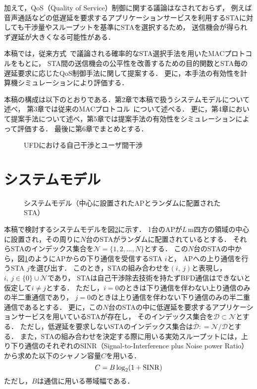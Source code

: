 \documentclass[technicalreport]{ieicej}
\newcommand{\sij}{(i,\ j)}
\newcommand{\mN}{{\mathcal N}}
\def\coloneqq{\mathrel{\mathop:}=}
\begin{document}
	加えて，QoS（Quality of Service）制御に関する議論はなされておらず，
	例えば音声通話などの低遅延を要求するアプリケーションサービスを利用するSTAに対しても干渉量やスループットを基準にSTAを選択するため，
	送信機会が得られず遅延が大きくなる可能性がある．
	\par
	本稿では，従来方式~\cite{promac}で議論される確率的なSTA選択手法を用いたMACプロトコルをもとに，
	STA間の送信機会の公平性を改善するための目的関数とSTA毎の遅延要求に応じたQoS制御手法に関して提案する．
	更に，本手法の有効性を計算機シミュレーションにより評価する．
	\par
	本稿の構成は以下のとおりである．第2章で本稿で扱うシステムモデルについて述べ，
	第3章では従来のMACプロトコル~\cite{promac}について述べる．
	更に，第4章において提案手法について述べ，第5章では提案手法の有効性をシミュレーションによって評価する．
	最後に第6章でまとめとする．

	\begin{figure}[t]
		\centering
		\caption{UFDにおける自己干渉とユーザ間干渉}
		\label{fig:topology}
	\end{figure}

\section{システムモデル}
	\begin{figure}[t]
		\centering
		\caption{システムモデル（中心に設置されたAPとランダムに配置されたSTA）}
		\label{fig:model}
	\end{figure}

	本稿で検討するシステムモデルを図\ref{fig:model}に示す．
	1台のAPが$L$\,m四方の領域の中心に設置され，その周りに$N$台のSTAがランダムに配置されているとする．
	それらSTAのインデックス集合を$\mN=\{1,2,...,N\}$とする．
	この$N$台のSTAの中から，図\ref{fig:topology}のようにAPからの下り通信を受信するSTA $i$と，
	APへの上り通信を行うSTA $j$を選び出す．
	このとき，STAの組み合わせを$\sij$と表現し，$i,\ j \in \{0\}\cup \mN$であり，
	STAは自己干渉除去技術を持たずBFD通信はできないと仮定して$i\neq j$とする．
	ただし，$i=0$のときは下り通信を伴わない上り通信のみの半二重通信であり，
	$j=0$のときは上り通信を伴わない下り通信のみの半二重通信であるとする．
	更に，この$N$台のSTAの中に低遅延を要求するアプリケーションサービスを用いているSTAが存在し，
	そのインデックス集合を${\mathcal D}\subset\mN$とする．
	ただし，低遅延を要求しないSTAのインデックス集合は${\overline {\mathcal D}}\coloneqq{\mathcal N}/{\mathcal D}$とする．
	また，STAの組み合わせを決定する際に用いる実効スループットには，上り下り通信のそれぞれのSINR（Signal-to-Interference plus Noise power Ratio）から求めた以下のシャノン容量$C$を用いる．
	\begin{equation}
		C=B\log_2(1+{\rm SINR}) \label{eq:capacity}
	\end{equation}
	ただし，$B$は通信に用いる帯域幅である．
\end{document}
